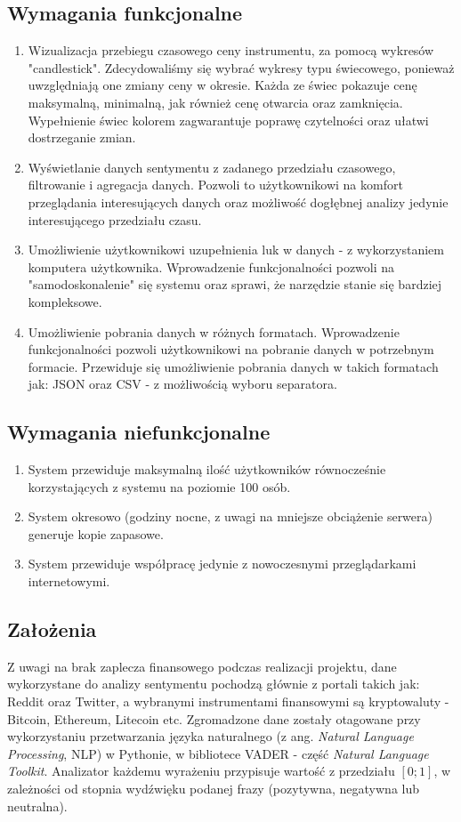 \subsection{Wymagania funkcjonalne}
\begin{enumerate}
  \item {Wizualizacja przebiegu czasowego ceny instrumentu, za pomocą wykresów "candlestick". Zdecydowaliśmy się wybrać wykresy typu świecowego, ponieważ uwzględniają one zmiany ceny w okresie. Każda ze świec pokazuje cenę maksymalną, minimalną, jak również cenę otwarcia oraz zamknięcia. Wypełnienie świec kolorem zagwarantuje poprawę czytelności oraz ułatwi dostrzeganie zmian.}
  \item {Wyświetlanie danych sentymentu z zadanego przedziału czasowego, filtrowanie i agregacja danych. Pozwoli to użytkownikowi na komfort przeglądania interesujących danych oraz możliwość dogłębnej analizy jedynie interesującego przedziału czasu.}
  \item {Umożliwienie użytkownikowi uzupełnienia luk w danych - z wykorzystaniem komputera użytkownika. Wprowadzenie funkcjonalności pozwoli na "samodoskonalenie" się systemu oraz sprawi, że narzędzie stanie się bardziej kompleksowe.}
  \item {Umożliwienie pobrania danych w różnych formatach. Wprowadzenie funkcjonalności pozwoli użytkownikowi na pobranie danych w potrzebnym formacie. Przewiduje się umożliwienie pobrania danych w takich formatach jak: JSON oraz CSV - z możliwością wyboru separatora.}
\end{enumerate}
  \clearpage
\subsection{Wymagania niefunkcjonalne}
\begin{enumerate}
  \item {System przewiduje maksymalną ilość użytkowników równocześnie korzystających z systemu na poziomie 100 osób.}
  \item {System okresowo (godziny nocne, z uwagi na mniejsze obciążenie serwera) generuje kopie zapasowe.}
  \item {System przewiduje współpracę jedynie z nowoczesnymi przeglądarkami internetowymi.}
\end{enumerate}
\subsection{Założenia}
Z uwagi na brak zaplecza finansowego podczas realizacji projektu, dane wykorzystane do analizy sentymentu pochodzą głównie z portali takich jak: Reddit oraz Twitter, a wybranymi instrumentami finansowymi są kryptowaluty - Bitcoin, Ethereum, Litecoin etc. Zgromadzone dane zostały otagowane przy wykorzystaniu przetwarzania języka naturalnego (z ang. \textit{Natural Language Processing}, NLP) w Pythonie, w bibliotece VADER - część \textit{Natural Language Toolkit}. Analizator każdemu wyrażeniu przypisuje wartość z przedziału $[0; 1]$, w zależności od stopnia wydźwięku podanej frazy (pozytywna, negatywna lub neutralna).
